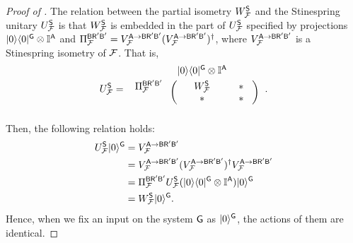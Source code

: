 \begin{proof}[Proof of ]
The relation between the partial isometry $W_\cF^\sS$ and the Stinespring unitary $U_\cF^\sS$ is that $W_\cF^\sS$ is embedded in the part of $U_\cF^\sS$ specified by projections $\ketbra{0}{0}^\sG\otimes\bI^\sA$ and $\Pi_\cF^{\sB\sR'\sB'} = V_\cF^{\sA\rarr\sB\sR'\sB'}(V_\cF^{\sA\rarr\sB\sR'\sB'})^\dag$, where $V_\cF^{\sA\rarr\sB\sR'\sB'}$ is a Stinespring isometry of $\cF$. That is, 
\begin{align}
        U_\cF^\sS
        = \hspace{1mm}
\begin{blockarray}{ccc}
 & \ketbra{0}{0}^\sG\otimes\bI^\sA &  & \vspace{1mm}\\
\begin{block}{c(cc)}
  \Pi_\cF^{\sB\sR'\sB'} \hspace*{1mm} & W_\cF^\sS & \hspace{0mm} * \hspace{3mm}\\
   \hspace*{1mm} & * & \hspace{0mm} * \hspace{3mm}\\
\end{block}
\end{blockarray}\hspace{2.5mm}.
\end{align}
Then, the following relation holds:
\begin{align}
    U_\cF^\sS\ket{0}^\sG 
    &= V_\cF^{\sA\rarr\sB\sR'\sB'} \\
    &= V_\cF^{\sA\rarr\sB\sR'\sB'}(V_\cF^{\sA\rarr\sB\sR'\sB'})^\dag V_\cF^{\sA\rarr\sB\sR'\sB'} \\
    &= \Pi_\cF^{\sB\sR'\sB'} U_\cF^{\sS} (\ketbra{0}{0}^\sG\otimes\bI^\sA) \ket{0}^\sG \\
    & = W_\cF^\sS \ket{0}^\sG.
\end{align}
Hence, when we fix an input on the system $\sG$ as $\ket{0}^\sG$, the actions of them are identical.



\end{proof}
